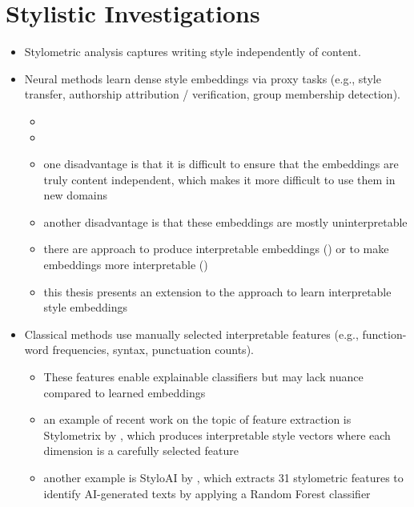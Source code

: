 \section{Stylistic Investigations}
\label{sec:background:styleInvestigations}
\begin{itemize}
  \item Stylometric analysis captures writing style independently of content.
  \item Neural methods learn dense style embeddings via proxy tasks (e.g., style transfer, authorship attribution / verification, group membership detection).
        \begin{itemize}
          \item %
          \item %
          \item one disadvantage is that it is difficult to ensure that the embeddings are truly content independent, which makes it more difficult to use them in new domains %
          \item another disadvantage is that these embeddings are mostly uninterpretable
          \item there are approach to produce interpretable embeddings (\cite{patelLearningInterpretableStyle2023}) or to make embeddings more interpretable (\cite{alshomaryLatentSpaceInterpretation2024})
          \item this thesis presents an extension to the approach to learn interpretable style embeddings
        \end{itemize}
  \item Classical methods use manually selected interpretable features (e.g., function-word frequencies, syntax, punctuation counts). %
        \begin{itemize}
          \item These features enable explainable classifiers but may lack nuance compared to learned embeddings
          \item an example of recent work on the topic of feature extraction is Stylometrix by \citet{okulskaStyloMetrixOpensourceMultilingual2023}, which produces interpretable style vectors where each dimension is a carefully selected feature
          \item another example is StyloAI by \citet{oparaStyloAIDistinguishingAIgenerated2024}, which extracts \num{31} stylometric features to identify AI-generated texts by applying a Random Forest classifier

\end{itemize}
\end{itemize}
